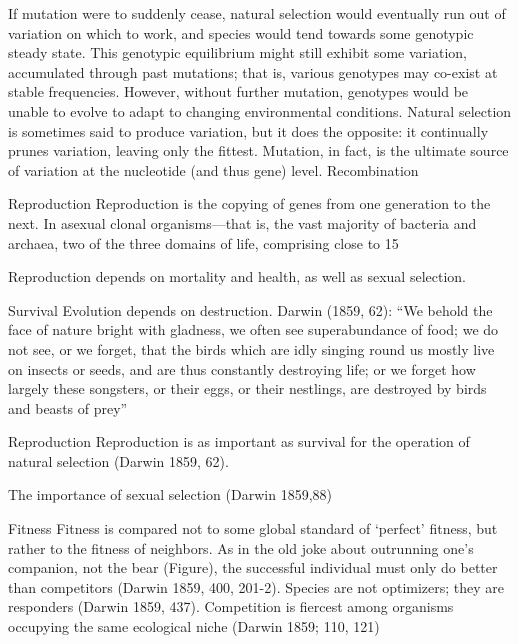 \documentclass{tufte-book} %
\begin{document}
If mutation were to suddenly cease, natural selection would eventually run out of variation on which to work, and species would tend towards some genotypic steady state. This genotypic equilibrium might still exhibit some variation, accumulated through past mutations; that is, various genotypes may co-exist at stable frequencies. However, without further mutation, genotypes would be unable to evolve to adapt to changing environmental conditions. Natural selection is sometimes said to produce variation, but it does the opposite: it continually prunes variation, leaving only the fittest. Mutation, in fact, is the ultimate source of variation at the nucleotide (and thus gene) level.
Recombination

Reproduction
Reproduction is the copying of genes from one generation to the next. In asexual clonal organisms—that is, the vast majority of bacteria and archaea, two of the three domains of life, comprising close to 15%



Reproduction depends on mortality and health, as well as sexual selection.


Survival
Evolution depends on destruction. Darwin (1859, 62):
“We behold the face of nature bright with gladness, we often see superabundance of food; we do not see, or we forget, that the birds which are idly singing round us mostly live on insects or seeds, and are thus constantly destroying life; or we forget how largely these songsters, or their eggs, or their nestlings, are destroyed by birds and beasts of prey” 


Reproduction
Reproduction is as important as survival for the operation of natural selection (Darwin 1859, 62). 

The importance of sexual selection (Darwin 1859,88)

Fitness
Fitness is compared not to some global standard of ‘perfect’ fitness, but rather to the fitness of neighbors. As in the old joke about outrunning one’s companion, not the bear (Figure), the successful individual must only do better than competitors (Darwin 1859, 400, 201-2). Species are not optimizers; they are responders (Darwin 1859, 437). Competition is fiercest among organisms occupying the same ecological niche (Darwin 1859; 110, 121)
\end{document}
